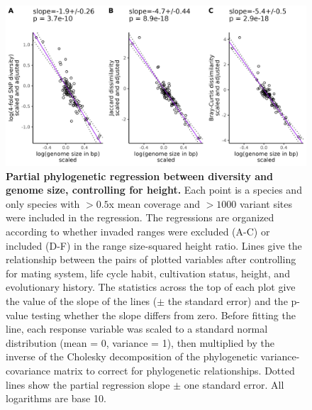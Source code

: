 \documentclass[12pt]{article}
\begin{document}
\begin{figure}[H]
    \centering
    \includegraphics[width=\textwidth]{figures/appendix_d/height_vs_genome_size_corrected_2024-12-12.jpg}
    \caption{\textbf{Partial phylogenetic regression between diversity and genome size, controlling for height.} Each point is a species and only species with $>0.5$x mean coverage and $>1000$ variant sites were included in the regression. The regressions are organized according to whether invaded ranges were excluded (A-C) or included (D-F) in the range size-squared height ratio. Lines give the relationship between the pairs of plotted variables after controlling for mating system, life cycle habit, cultivation status, height, and evolutionary history. The statistics across the top of each plot give the value of the slope of the lines ($\pm$ the standard error) and the p-value testing whether the slope differs from zero. Before fitting the line, each response variable was scaled to a standard normal distribution (mean = 0, variance = 1), then multiplied by the inverse of the Cholesky decomposition of the phylogenetic variance-covariance matrix to correct for phylogenetic relationships. Dotted lines show the partial regression slope $\pm$ one standard error. All logarithms are base 10.}
\end{figure}

\newpage

\end{document}
